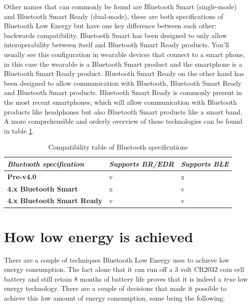 \documentclass[pdftex,a4paper,12pt,twoside]{report}
\begin{document}
Other names that can commonly be found are Bluetooth Smart (single-mode) and Bluetooth Smart Ready (dual-mode), these are both specifications of Bluetooth Low Energy but have one key difference between each other: backwards compatibility. Bluetooth Smart has been designed to only allow interoperability between itself and Bluetooth Smart Ready products. You'll usually see this configuration in wearable devices that connect to a smart phone, in this case the wearable is a Bluetooth Smart product and the smartphone is a Bluetooth Smart Ready product. Bluetooth Smart Ready on the other hand has been designed to allow communication with Bluetooth, Bluetooth Smart Ready and Bluetooth Smart products. Bluetooth Smart Ready is commonly present in the most recent smartphones, which will allow communication with Bluetooth products like headphones but also Bluetooth Smart products like a smart band. A more comprehensible and orderly overview of these technologies can be found in table \ref{table:configurations}.

\begin{table}[]
\centering
\caption{Compatibility table of Bluetooth specifications}
\label{table:configurations}
\begin{tabular}{|l|l|l|}
\hline
\textit{\textbf{Bluetooth specification}} & \textit{\textbf{Supports BR/EDR}} & \textit{\textbf{Supports BLE}} \\ \hline
\textbf{Pre-v4.0}                   & v                                 & x                              \\ \hline
\textbf{4.x Bluetooth Smart}        & x                                 & v                              \\ \hline
\textbf{4.x Bluetooth Smart Ready}  & v                                 & v                              \\ \hline
\end{tabular}
\end{table}

\section{How low energy is achieved}
\label{sec:lowenergy}
There are a couple of techniques Bluetooth Low Energy uses to achieve low energy consumption. The fact alone that it can run off a 3 volt CR2032 coin cell battery and still retain 8 months of battery life proves that it is indeed a \textit{true} low energy technology. There are a couple of decisions that made it possible to achieve this low amount of energy consumption, some being the following:
\end{document}
